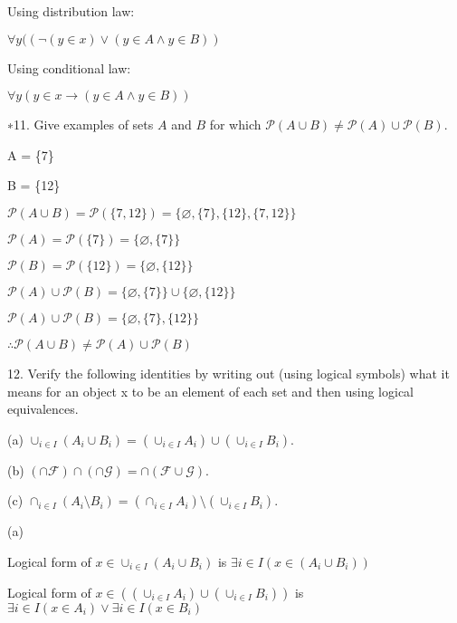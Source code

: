 \documentclass{article}
\begin{document}
Using distribution law:

$\forall y ((\neg (y \in x) \lor (y \in A \land y \in B))$

Using conditional law:

$\forall y (y \in x \to (y \in A \land y \in B))$


\vspace{30pt}

∗11. Give examples of sets $A$ and $B$ for which $\mathcal{P}(A \cup B) \neq \mathcal{P}(A) \cup \mathcal{P}(B)$.
\vspace{30pt}

A = \{7\}

B = \{12\}

$\mathcal{P}(A \cup B) = \mathcal{P}(\{7, 12\}) = \{\varnothing, \{7\}, \{12\}, \{7, 12\}\}$

$\mathcal{P}(A) = \mathcal{P}(\{7\}) = \{\varnothing, \{7\}\}$

$\mathcal{P}(B) = \mathcal{P}(\{12\}) = \{\varnothing, \{12\}\}$

$\mathcal{P}(A) \cup \mathcal{P}(B) = \{\varnothing, \{7\}\} \cup \{\varnothing, \{12\}\}$

$\mathcal{P}(A) \cup \mathcal{P}(B) = \{\varnothing, \{7\},\{12\}\}$

$\therefore \mathcal{P}(A \cup B) \neq \mathcal{P}(A) \cup \mathcal{P}(B)$

\vspace{30pt}

12. Verify the following identities by writing out (using logical symbols)
what it means for an object x to be an element of each set and then using logical equivalences.

\hspace{12pt}(a) $\cup_{i \in I} (A_i \cup B_i) = (\cup_{i \in I} A_i) \cup (\cup_{i \in I} B_i)$.

\hspace{12pt}(b) $(\cap \mathcal{F}) \cap (\cap \mathcal{G}) = \cap (\mathcal{F} \cup \mathcal{G})$.

\hspace{12pt}(c) $\cap_{i \in I} (A_i \setminus B_i) = (\cap_{i \in I} A_i) \setminus (\cup_{i \in I} B_i)$.
\vspace{30pt}

(a)

Logical form of $x \in \cup_{i \in I} (A_i \cup B_i)$ is $\exists i \in I (x \in (A_i \cup B_i))$

Logical form of $x \in ((\cup_{i \in I} A_i) \cup (\cup_{i \in I} B_i))$ is $\exists i \in I (x \in A_i) \lor \exists i \in I (x \in B_i)$
\end{document}
